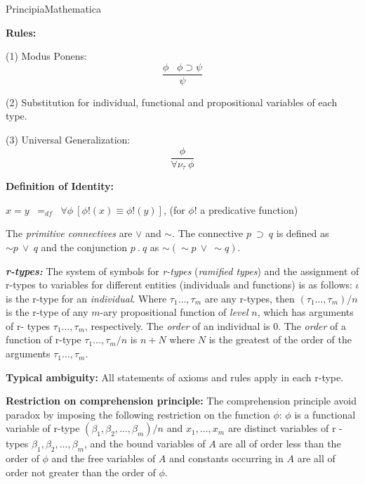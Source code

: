 \begin{entry}{PrincipiaMathematica}
\begin{calculus}
\begin{center}
\textbf{Rules:}


(1) Modus Ponens: \[ \frac{\phi \; \; \; \phi \supset \psi}{\psi} \]

(2) Substitution for individual, functional and propositional variables of each type. 

\medskip

(3) Universal Generalization: \[ \frac{\phi}{\forall \nu_{\tau} \: \phi}  \]



\textbf{Definition of Identity:}

$ x = y \;\; =_{df} \;\; \forall \phi \: [\phi ! (x) \equiv \phi ! (y) ]$, (for $\phi !$ a  predicative function)


\end{center}
\end{calculus}


\begin{clarifications} The
\emph{primitive connectives} are $ \vee $ and $\sim$. The connective $p \: \supset \: q$ is defined as $ \sim p \: \vee \: q$ and the conjunction $p\: . \: q$ as $\sim \! (\sim \! p \: \vee \: \sim \! q)$.

{\bf {\em r-types:}}
The system of symbols for {\em r-types} ({\em ramified types}) and the assignment of  r-types to variables for different entities (individuals and functions) is as follows:
$\iota$ is the r-type for an {\em individual}. Where $\tau_1 
\ldots, \tau_m$ are any r-types, then $(\tau_1 
\ldots, \tau_m) / n$ is  the r-type of any $m$-ary propositional function of {\em level} $n$, which has arguments of r- types $\tau_1 
\ldots, \tau_m$, respectively. 
 The {\em order} of an individual  is 0.
The {\em order} of a function of r-type $\tau_1 
\ldots, \tau_m / n$ is $n+N$ where $N$ is the greatest of the order of the arguments $\tau_1 
\ldots, \tau_m$.

{\bf Typical ambiguity:} All statements of axioms and rules apply in each r-type.

{\bf Restriction on comprehension principle:} The comprehension principle avoid paradox by imposing the following restriction on the function $\phi$: $\phi$ is a functional variable of r-type $(\beta_1, \beta_2, \ldots, \beta_m )/ n$ and $x_1, \ldots , x_m$ are distinct variables of r -types $\beta_1, \beta_2, \ldots, \beta_m$, and the bound variables of $A$ are all of order less than the order of $\phi$ and the free variables of $A$ and constants occurring in $A$ are all of order not greater than the order of $\phi$.



\end{clarifications}
\end{entry}

